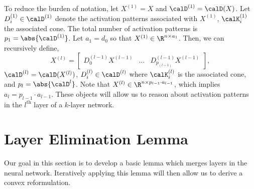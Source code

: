 \documentclass{article}
\newcommand{\Dl}{D^{(l)}}
\newcommand{\Done}{D^{(1)}}
\newcommand{\calDl}{\calD^{(l)}}
\newcommand{\calDone}{\calD^{(1)}}
\newcommand{\calKl}{\calK^{(l)}}
\newcommand{\calKone}{\calK^{(1)}}
\newcommand{\Xl}{X^{(l)}}
\newcommand{\Xone}{X^{(1)}}
\begin{document}
To reduce the burden of notation, let \( \Xone = X \) and \( \calDone =
\calD(X) \).
Let \( \Done_i \in \calDone \) denote the activation patterns associated
with \( \Xone \), \( \calKone_i \) the associated cone.
The total number of activation patterns is \( p_1 = \abs{\calDone} \).
Let \( a_1 = d_0 \) so that \( \Xone \in \R^{n \times a_1} \).
Then, we can recursively define,
\begin{equation}
    \Xl =
    \begin{bmatrix}
        D_0^{(l-1)} X^{(l-1)} & \ldots & D^{(l-1)}_{p_{(l-1)}} X^{(l-1)}
    \end{bmatrix}
    ,
\end{equation}
\( \calDl = \calD(\Xl) \), \( \Dl_i \in \calDl \) where \(
\calKl_i \) is the associated cone, and \( p_l = \abs{\calD^l} \).
Note that \( \Xl \in \R^{n \times p_{l-1} \cdot a_{l-1}} \), which implies \(
a_l = p_{l-1} \cdot a_{l-1} \).
These objects will allow us to reason about activation patterns in the \(
l^{\text{th}} \) layer of a \( k \)-layer network.

\section{Layer Elimination Lemma}

Our goal in this section is to develop a basic lemma which merges layers in
the neural network.
Iteratively applying this lemma will then allow us to derive a convex
reformulation.
\end{document}
